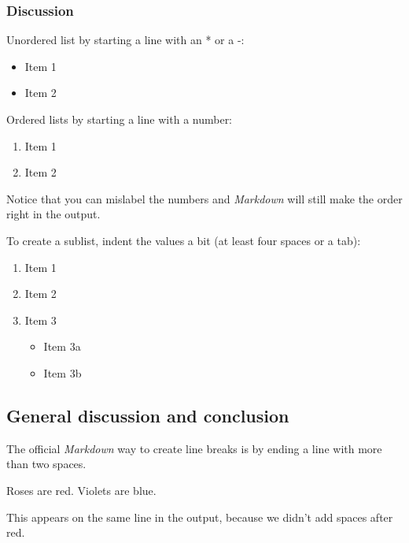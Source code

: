 \documentclass[a4paper, twoside]{templates/ociamthesis}
\providecommand{\tightlist}{%
  \setlength{\itemsep}{0pt}\setlength{\parskip}{0pt}}
\begin{document}
\hypertarget{discussion-1}{%
\subsubsection{Discussion}\label{discussion-1}}

Unordered list by starting a line with an * or a -:

\begin{itemize}
\tightlist
\item
  Item 1
\item
  Item 2
\end{itemize}

Ordered lists by starting a line with a number:

\begin{enumerate}
\def\labelenumi{\arabic{enumi}.}
\tightlist
\item
  Item 1
\item
  Item 2
\end{enumerate}

Notice that you can mislabel the numbers and \emph{Markdown} will still make the order right in the output.

To create a sublist, indent the values a bit (at least four spaces or a tab):

\begin{enumerate}
\def\labelenumi{\arabic{enumi}.}
\tightlist
\item
  Item 1
\item
  Item 2
\item
  Item 3

  \begin{itemize}
  \tightlist
  \item
    Item 3a
  \item
    Item 3b
  \end{itemize}
\end{enumerate}

\hypertarget{general-discussion-and-conclusion}{%
\subsection{General discussion and conclusion}\label{general-discussion-and-conclusion}}

The official \emph{Markdown} way to create line breaks is by ending a line with more than two spaces.

Roses are red.
Violets are blue.

This appears on the same line in the output, because we didn't add spaces after red.
\end{document}
